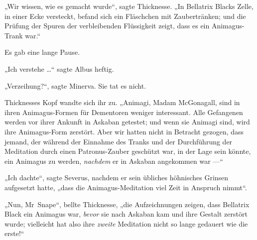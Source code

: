 „Wir wissen, wie es gemacht wurde“, sagte Thicknesse.
„In Bellatrix Blacks Zelle, in einer Ecke versteckt, befand sich ein Fläschchen mit Zaubertränken; und die Prüfung der Spuren der verbleibenden Flüssigkeit zeigt, dass es ein Animagus-Trank war.“

Es gab eine lange Pause.

„Ich verstehe …“ sagte Albus heftig.

„Verzeihung?“, sagte Minerva. Sie tat es nicht.

Thicknesses Kopf wandte sich ihr zu.
„Animagi, Madam McGonagall, sind in ihren Animagus-Formen für Dementoren weniger interessant. Alle Gefangenen werden vor ihrer Ankunft in Askaban getestet; und wenn sie Animagi sind, wird ihre Animagus-Form zerstört. Aber wir hatten nicht in Betracht gezogen, dass jemand, der während der Einnahme des Tranks und der Durchführung der Meditation durch einen Patronus-Zauber geschützt war, in der Lage sein könnte, ein Animagus zu werden, \emph{nachdem} er in Askaban angekommen war —“

„Ich dachte“, sagte Severus, nachdem er sein übliches höhnisches Grinsen aufgesetzt hatte, „dass die Animagus-Meditation viel Zeit in Anspruch nimmt“.

„Nun, Mr~Snape“, bellte Thicknesse, „die Aufzeichnungen zeigen, dass Bellatrix Black ein Animagus war, \emph{bevor} sie nach Askaban kam und ihre Gestalt zerstört wurde; vielleicht hat also ihre \emph{zweite} Meditation nicht so lange gedauert wie die erste!“

